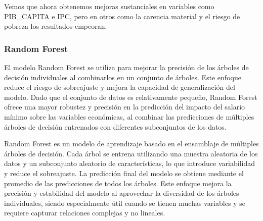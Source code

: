 \documentclass[11pt]{article}
\begin{document}
    
    Vemos que ahora obtenemos mejoras sustanciales en variables como
PIB\_CAPITA e IPC, pero en otros como la carencia material y el riesgo
de pobreza los resultados empeoran.

    \subsubsection{Random Forest}\label{random-forest}

    El modelo Random Forest se utiliza para mejorar la precisión de los
árboles de decisión individuales al combinarlos en un conjunto de
árboles. Este enfoque reduce el riesgo de sobreajuste y mejora la
capacidad de generalización del modelo. Dado que el conjunto de datos es
relativamente pequeño, Random Forest ofrece una mayor robustez y
precisión en la predicción del impacto del salario mínimo sobre las
variables económicas, al combinar las predicciones de múltiples árboles
de decisión entrenados con diferentes subconjuntos de los datos.

Random Forest es un modelo de aprendizaje basado en el ensamblaje de
múltiples árboles de decisión. Cada árbol se entrena utilizando una
muestra aleatoria de los datos y un subconjunto aleatorio de
características, lo que introduce variabilidad y reduce el sobreajuste.
La predicción final del modelo se obtiene mediante el promedio de las
predicciones de todos los árboles. Este enfoque mejora la precisión y
estabilidad del modelo al aprovechar la diversidad de los árboles
individuales, siendo especialmente útil cuando se tienen muchas
variables y se requiere capturar relaciones complejas y no lineales.
\end{document}
